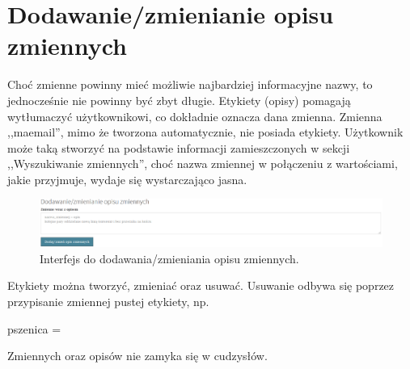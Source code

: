 \documentclass[12pt, twoside, hidelinks]{report}
\begin{document}
\section{Dodawanie/zmienianie opisu zmiennych}
Choć zmienne powinny mieć możliwie najbardziej informacyjne nazwy, to jednocześnie nie powinny być zbyt długie. Etykiety (opisy) pomagają wytłumaczyć użytkownikowi, co dokładnie oznacza dana zmienna. Zmienna ,,ma\textunderscore email'', mimo że tworzona automatycznie, nie posiada etykiety. Użytkownik może taką stworzyć na podstawie informacji zamieszczonych w sekcji ,,Wyszukiwanie zmiennych'', choć nazwa zmiennej w połączeniu z wartościami, jakie przyjmuje, wydaje się wystarczająco jasna. \par
\begin{figure}[h!]
\includegraphics[width = 1\textwidth]{3.1.}
\caption{Interfejs do dodawania/zmieniania opisu zmiennych.}
\label{dodawanie_usuwanie_opisu_zmiennych_interfejs}
\end{figure}
Etykiety można tworzyć, zmieniać oraz usuwać. Usuwanie  odbywa się poprzez przypisanie zmiennej pustej etykiety, np. \par
\begin{center}
pszenica = 
\end{center}
Zmiennych oraz opisów nie zamyka się w cudzysłów.
\end{document}
